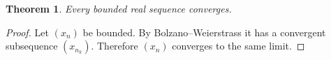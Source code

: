 \documentclass{article}
\newtheorem{theorem}{Theorem}
\begin{document}
\begin{theorem}\label{thm:bounded-sequence}
Every bounded real sequence converges.
\end{theorem}
\begin{proof}
Let $(x_n)$ be bounded. By Bolzano--Weierstrass it has a convergent
subsequence $(x_{n_k})$. Therefore $(x_n)$ converges to the same limit.
\end{proof}
\end{document}
